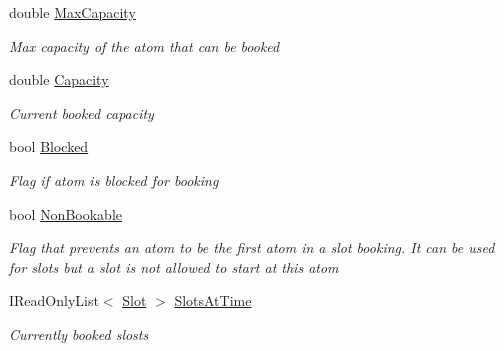 \begin{DoxyCompactItemize}
double \hyperlink{class_general_health_care_elements_1_1_booking_models_1_1_time_atom_adf15348042543f4626a1148e31083b99}{Max\+Capacity}
\begin{DoxyCompactList}\small\item\em Max capacity of the atom that can be booked \end{DoxyCompactList}\item 
double \hyperlink{class_general_health_care_elements_1_1_booking_models_1_1_time_atom_ac0b8fb67050d24d7b5d9ac044afd87ea}{Capacity}
\begin{DoxyCompactList}\small\item\em Current booked capacity \end{DoxyCompactList}\item 
bool \hyperlink{class_general_health_care_elements_1_1_booking_models_1_1_time_atom_acf166733898dfce5f1a37539da08ebd5}{Blocked}
\begin{DoxyCompactList}\small\item\em Flag if atom is blocked for booking \end{DoxyCompactList}\item 
bool \hyperlink{class_general_health_care_elements_1_1_booking_models_1_1_time_atom_a32b761cdef478ffe5c44fa9e82378588}{Non\+Bookable}
\begin{DoxyCompactList}\small\item\em Flag that prevents an atom to be the first atom in a slot booking. It can be used for slots but a slot is not allowed to start at this atom \end{DoxyCompactList}\item 
I\+Read\+Only\+List$<$ \hyperlink{class_general_health_care_elements_1_1_booking_models_1_1_slot}{Slot} $>$ \hyperlink{class_general_health_care_elements_1_1_booking_models_1_1_time_atom_a2bed78658e9887234dca117a78e12df0}{Slots\+At\+Time}
\begin{DoxyCompactList}\small\item\em Currently booked slosts \end{DoxyCompactList}\end{DoxyCompactItemize}


